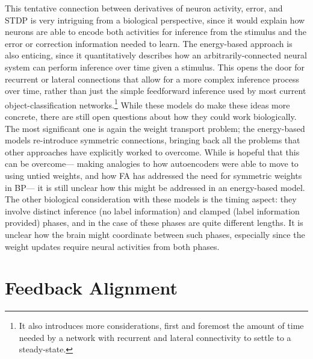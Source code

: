 This tentative connection between derivatives of neuron activity,
error, and STDP is very intriguing from a biological perspective,
since it would explain how neurons
are able to encode both activities for inference from the stimulus
and the error or correction information needed to learn.
The energy-based approach is also enticing,
since it quantitatively describes how an arbitrarily-connected neural system
can perform inference over time given a stimulus.
This opens the door for recurrent or lateral connections
that allow for a more complex inference process over time,
rather than just the simple feedforward inference used by
most current object-classification networks.\footnote{
  It also introduces more considerations,
  first and foremost the amount of time needed by a network
  with recurrent and lateral connectivity to settle to a steady-state.}
While these models do make these ideas more concrete,
there are still open questions about how they could work biologically.
The most significant one is again the weight transport problem;
the energy-based models re-introduce symmetric connections,
bringing back all the problems that other approaches
have explicitly worked to overcome.
While \textcite{Scellier2017} is hopeful that this can be overcome---%
making analogies to how autoencoders were able to move to using untied weights,
and how FA has addressed the need for symmetric weights in BP---%
it is still unclear how this might be addressed in an energy-based model.
The other biological consideration with these models is the timing aspect:
they involve distinct inference (no label information)
and clamped (label information provided) phases,
and in the case of \textcite{Scellier2017} these phases
are quite different lengths.
It is unclear how the brain might coordinate between such phases,
especially since the weight updates require neural activities
from both phases.



\section{Feedback Alignment}

